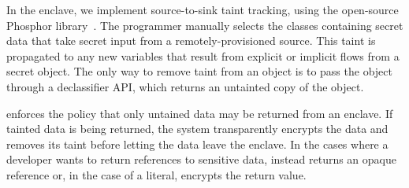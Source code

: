 

In the enclave, we implement source-to-sink taint tracking, using the open-source Phosphor library~\citep{phosphor}.
The programmer manually selects the classes containing secret data that take secret input from a remotely-provisioned source.
This taint is propagated to any new variables that result from explicit or implicit flows from a secret object.
The only way to remove taint from an object is to pass the object through a \systemname{} declassifier API,
which returns an untainted copy of the object.


\systemname{} enforces the policy that only untained data may be returned from an enclave.
If tainted data is being returned, the system transparently encrypts the data and removes its taint before letting the data leave the enclave.
In the cases where a developer wants to return references to sensitive data, \systemname{} instead returns an opaque reference or, in the case of a literal, encrypts the return value.



